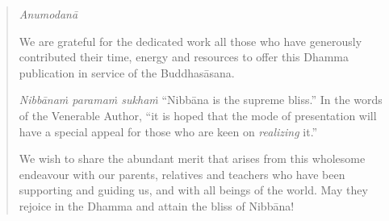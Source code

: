 \cleartorecto
\thispagestyle{empty}

\mbox{}\vfill

\begin{verse}
\upshape

{\crimsonRomanFont\chapterTitleSize\selectfont\color{textbody}\itshape Anumodanā}

\vspace*{\baselineskip}

We are grateful for the dedicated work all those who have generously contributed their time, energy and resources to offer this Dhamma publication in service of the Buddhasāsana.

\emph{Nibbānaṁ paramaṁ sukhaṁ} ``Nibbāna is the supreme bliss.'' In the words of the Venerable Author, ``it is hoped that the mode of presentation will have a special appeal for those who are keen on \emph{realizing} it.''

We wish to share the abundant merit that arises from this wholesome endeavour with our parents, relatives and teachers who have been supporting and guiding us, and with all beings of the world. May they rejoice in the Dhamma and attain the bliss of Nibbāna!

\end{verse}

\vfill\mbox{}
